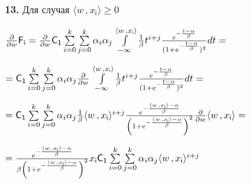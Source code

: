 \documentclass[a4paper,12pt]{article}
\begin{document}
\noindent\textbf{13.} Для случая $\langle w \,, x_{\mathsf{i}}\rangle \geq{0}$

\begin{center}
    ${\partial\over{\partial w}} \mathsf{F_i} = {\partial\over{\partial w}} \mathsf{C_1} \sum\limits_{i = 0}^k \sum\limits_{j = 0}^k \alpha_i \alpha_j \int\limits_{-\infty}^{\langle w \,, x_{\mathsf{i}}\rangle} {1\over{\beta}} t^{i + j} {e^{-{t - \alpha\over{\beta}}}\over{(1 + e^{-{t - \alpha\over{\beta}}}})^2} d t = $
\end{center}

\begin{center}
    $= \mathsf{C_1} \sum\limits_{i = 0}^k \sum\limits_{j = 0}^k \alpha_i \alpha_j {\partial\over{\partial w}} \int\limits_{-\infty}^{\langle w \,, x_{\mathsf{i}}\rangle} {1\over{\beta}} t^{i + j} {e^{-{t - \alpha\over{\beta}}}\over{(1 + e^{-{t - \alpha\over{\beta}}}})^2} d t = $
\end{center}

\begin{center}
    $= \mathsf{C_1} \sum\limits_{i = 0}^k \sum\limits_{j = 0}^k \alpha_i \alpha_j  {1\over{\beta}} \langle w \,, x_{\mathsf{i}}\rangle^{i + j} {e^{-{\langle w \,, x_{\mathsf{i}}\rangle - \alpha\over{\beta}}}\over{\left(1 + e^{-{\langle w \,, x_{\mathsf{i}}\rangle - \alpha\over{\beta}}}\right)^2}} {\partial\over{\partial w}} \langle w \,, x_{\mathsf{i}}\rangle = $
\end{center}

\begin{center}
    $= {e^{-{\langle w \,, x_{\mathsf{i}}\rangle - \alpha\over{\beta}}}\over{\beta\left(1 + e^{-{\langle w \,, x_{\mathsf{i}}\rangle - \alpha\over{\beta}}}\right)^2}} x_{\mathsf{i}} \mathsf{C_1} \sum\limits_{i = 0}^k \sum\limits_{j = 0}^k \alpha_i \alpha_j \langle w \,, x_{\mathsf{i}}\rangle^{i + j}$
\end{center}
\end{document}
